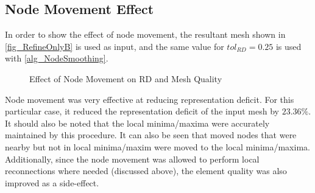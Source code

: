 \subsection{Node Movement Effect}
In order to show the effect of node movement, the resultant mesh shown
in \ref{fig_RefineOnlyB} is used as input, and the same value for
$tol_{RD} = 0.25$ is used with \ref{alg_NodeSmoothing}.

\begin{figure}[h!]
  \begin{center}
 
  \caption{Effect of Node Movement on RD and Mesh Quality}
  \label{fig_NodeSmoothing}

  \end{center}
\end{figure}

Node movement was very effective at reducing representation deficit.
For this particular case, it reduced the representation deficit of the
input mesh by $23.36\%$. It should also be noted that the local
minima/maxima were accurately maintained by this procedure. It can also
be seen that moved nodes that were nearby but not in local minima/maxim
were moved to the local minima/maxima. Additionally, since the node
movement was allowed to perform local reconnections where needed
(discussed above), the element quality was also improved as a
side-effect.


